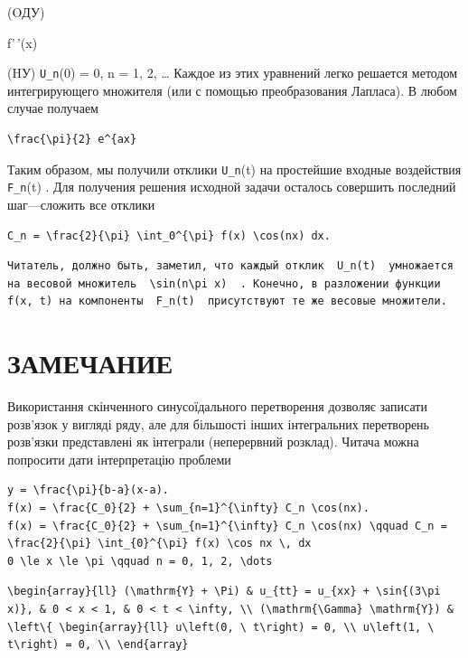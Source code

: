 \documentclass[
  ukrainian,
]{article}
\begin{document}
(OДУ)

f'\,'(x)

(HУ) \texttt{U\_n}(0) = 0, n = 1, 2, \ldots{} Каждое из этих уравнений
легко решается методом интегрирующего множителя (или с помощью
преобразования Лапласа). В любом случае получаем

\begin{verbatim}
\frac{\pi}{2} e^{ax}
\end{verbatim}

Таким образом, мы получили отклики \texttt{U\_n}(t) на простейшие
входные воздействия \texttt{F\_n}(t) . Для получения решения исходной
задачи осталось совершить последний шаг---сложить все отклики

\begin{verbatim}
C_n = \frac{2}{\pi} \int_0^{\pi} f(x) \cos(nx) dx.
\end{verbatim}

\begin{verbatim}
Читатель, должно быть, заметил, что каждый отклик  U_n(t)  умножается на весовой множитель  \sin(n\pi x)  . Конечно, в разложении функции f(x, t) на компоненты  F_n(t)  присутствуют те же весовые множители.
\end{verbatim}

\section{ЗАМЕЧАНИЕ}\label{ux437ux430ux43cux435ux447ux430ux43dux438ux435}

Використання скінченного синусоїдального перетворення дозволяє записати
розв'язок у вигляді ряду, але для більшості інших інтегральних
перетворень розв'язки представлені як інтеграли (неперервний розклад).
Читача можна попросити дати інтерпретацію проблеми

\begin{verbatim}
y = \frac{\pi}{b-a}(x-a).
f(x) = \frac{C_0}{2} + \sum_{n=1}^{\infty} C_n \cos(nx).
f(x) = \frac{C_0}{2} + \sum_{n=1}^{\infty} C_n \cos(nx) \qquad C_n = \frac{2}{\pi} \int_{0}^{\pi} f(x) \cos nx \, dx
0 \le x \le \pi \qquad n = 0, 1, 2, \dots
\end{verbatim}

\begin{verbatim}
\begin{array}{ll} (\mathrm{Y} + \Pi) & u_{tt} = u_{xx} + \sin{(3\pi x)}, & 0 < x < 1, & 0 < t < \infty, \\ (\mathrm{\Gamma} \mathrm{Y}) & \left\{ \begin{array}{ll} u\left(0, \ t\right) = 0, \\ u\left(1, \ t\right) = 0, \\ \end{array}
\end{verbatim}
\end{document}
